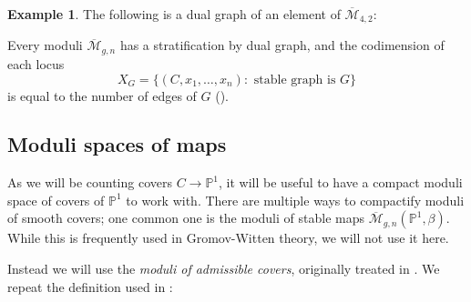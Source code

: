 \documentclass[11pt]{article}           %
\renewcommand{\P}{\mathbb P}
\theoremstyle{definition}
\newtheorem{eg}[thm]{Example}
\begin{document}
\begin{eg}
  The following is a dual graph of an element of $\overline{\mathcal M}_{4,2}$:


    Every moduli $\overline{\mathcal M}_{g,n}$ has a stratification
    by dual graph, and the codimension of each locus
    \[
    X_G=\{(C,x_1,\dots,x_n):\text{ stable graph is }G\}
    \]
    is equal to the number of edges of $G$ (\cite{Vakil}).
  
  \end{eg}


\subsection{Moduli spaces of maps}

As we will be counting covers $C\to\P^1$, it will be useful
to have a compact moduli space of covers of $\P^1$ to work with.
There are multiple ways to compactify moduli of smooth covers;
one common one is the moduli of stable maps $\overline{\mathcal M}_{g,n}(\P^1,\beta)$. While this is frequently used in Gromov-Witten theory,
we will not use it here.

Instead we will use the {\it moduli of admissible covers}, originally
treated in \cite{Admissible}. We repeat the definition used in \cite{Moduli}:
\end{document}

